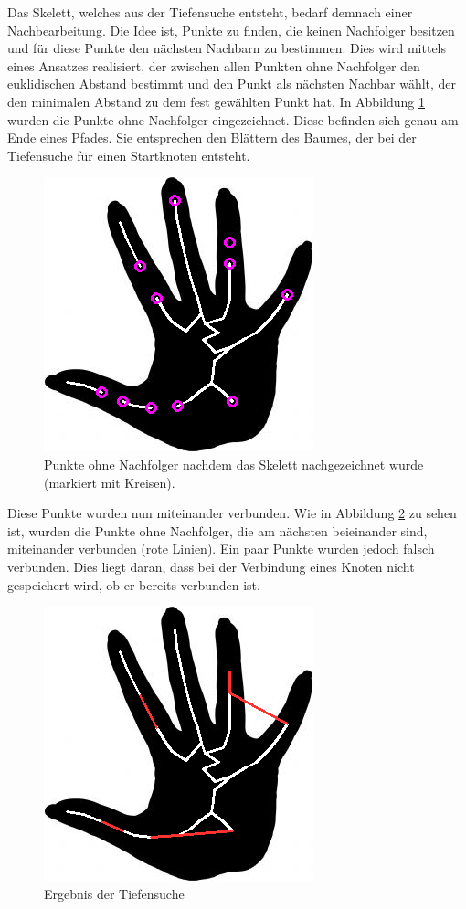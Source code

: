 Das Skelett, welches aus der Tiefensuche entsteht, bedarf demnach einer Nachbearbeitung. Die Idee ist, Punkte zu finden, die keinen Nachfolger besitzen und für diese Punkte den nächsten Nachbarn zu bestimmen. Dies wird mittels eines Ansatzes realisiert, der zwischen allen Punkten ohne Nachfolger den euklidischen Abstand bestimmt und den Punkt als nächsten Nachbar wählt, der den minimalen Abstand zu dem fest gewählten Punkt hat. In Abbildung \ref{fig:hand-punkte-ohne-nachfolger} wurden die Punkte ohne Nachfolger eingezeichnet. Diese befinden sich
genau am Ende eines Pfades. Sie entsprechen den Blättern des Baumes, der bei der Tiefensuche für einen Startknoten entsteht. 
\begin{figure}[htbp]
\centering
\includegraphics[width=0.4\linewidth]{./fig/hand-DFS-ohne-nachfolger}
\caption{Punkte ohne Nachfolger nachdem das Skelett nachgezeichnet wurde (markiert mit Kreisen).}
\label{fig:hand-punkte-ohne-nachfolger}
\end{figure}
Diese Punkte wurden nun miteinander verbunden. Wie in Abbildung \ref{fig:hand-DFS-endergebnis} zu sehen ist,
wurden die Punkte ohne Nachfolger, die am nächsten beieinander sind, miteinander verbunden (rote Linien). Ein paar Punkte wurden jedoch falsch verbunden. Dies liegt daran, dass bei der Verbindung eines Knoten
nicht gespeichert wird, ob er bereits verbunden ist. 
\begin{figure}[htbp]
\centering
\includegraphics[width=0.4\linewidth]{./fig/hand-DFS-endergebnis}
\caption{Ergebnis der Tiefensuche}
\label{fig:hand-DFS-endergebnis}
\end{figure}
\newpage
